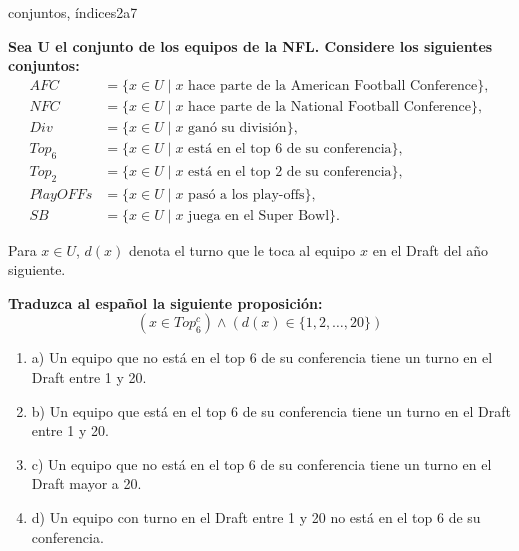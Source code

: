 \documentclass{article}
\begin{document}
\begin{question}{22}{conjuntos, índices}{2}{a}{7}{
\textbf{Sea U el conjunto de los equipos de la NFL. Considere los siguientes conjuntos:}
\[
\begin{aligned}
AFC &= \{ x \in U \mid x \text{ hace parte de la American Football Conference}\},\\
NFC &= \{ x \in U \mid x \text{ hace parte de la National Football Conference}\},\\
Div &= \{ x \in U \mid x \text{ ganó su división}\},\\
Top_6 &= \{ x \in U \mid x \text{ está en el top 6 de su conferencia}\},\\
Top_2 &= \{ x \in U \mid x \text{ está en el top 2 de su conferencia}\},\\
PlayOFFs &= \{ x \in U \mid x \text{ pasó a los play-offs}\},\\
SB &= \{ x \in U \mid x \text{ juega en el Super Bowl}\}.
\end{aligned}
\]

Para $x \in U$, $d(x)$ denota el turno que le toca al equipo $x$ en el Draft del año siguiente. \smallskip

\textbf{Traduzca al español la siguiente proposición:}
\[
(x \in Top_6^c)\land(d(x) \in \{1,2,\dots,20\})
\]

\begin{enumerate}
    \item a) Un equipo que no está en el top 6 de su conferencia tiene un turno en el Draft entre 1 y 20.  
    \item b) Un equipo que está en el top 6 de su conferencia tiene un turno en el Draft entre 1 y 20.  
    \item c) Un equipo que no está en el top 6 de su conferencia tiene un turno en el Draft mayor a 20.  
    \item d) Un equipo con turno en el Draft entre 1 y 20 no está en el top 6 de su conferencia.  
\end{enumerate}
}
\end{question}
\end{document}
